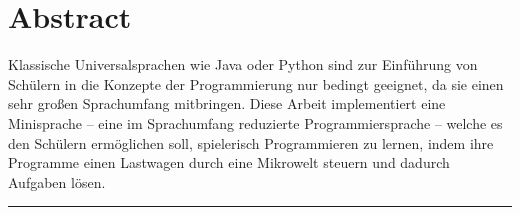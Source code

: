\chapter*{Abstract}
\label{sec:abstract}

Klassische Universalsprachen wie Java oder Python sind zur Einführung von Schülern in die Konzepte der Programmierung nur bedingt geeignet, da sie einen sehr großen Sprachumfang mitbringen. Diese Arbeit implementiert eine Minisprache – eine im Sprachumfang reduzierte Programmiersprache – welche es den Schülern ermöglichen soll, spielerisch Programmieren zu lernen, indem ihre Programme einen Lastwagen durch eine Mikrowelt steuern und dadurch Aufgaben lösen.

\rule{\textwidth}{1pt}

